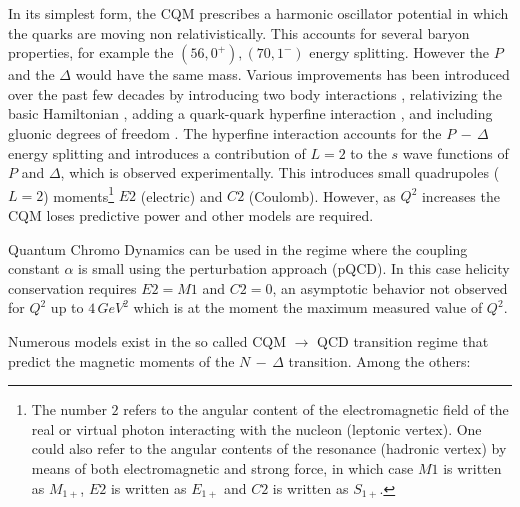 In its simplest form, the CQM prescribes a harmonic oscillator potential in which the quarks are moving
non relativistically. This accounts for several baryon properties, for example the $(56, 0^+),(70, 1^-)$
energy splitting. However the $P$ and the $\Delta$ would have the same mass.
Various improvements has been introduced over the past few decades by introducing two body interactions \cite{bib:twobody},
relativizing the basic Hamiltonian \cite{bib:relatiH}, adding a quark-quark hyperfine interaction \cite{bib:hyperfine},
 and including gluonic degrees of freedom \cite{bib:gluonic}.
The hyperfine interaction accounts for the $P\, -\,\Delta$ energy splitting and introduces a contribution of $L=2$ to the $s$ wave
functions of $P$ and $\Delta$, which is observed experimentally. This introduces small quadrupoles ($L=2$) 
moments\footnote{The number $2$ refers to the angular content of the electromagnetic field of the
real or virtual photon interacting with the nucleon (leptonic vertex). One could also refer to the angular 
contents of the resonance (hadronic vertex) by means of both electromagnetic and strong force, in 
which case $M1$ is written as $M_{1+}$, $E2$ is written as $E_{1+}$ and $C2$ is written as $S_{1+}$.}
$E2$ (electric) and $C2$ (Coulomb).
However, as $Q^2$ increases the CQM loses predictive power and other models are required. 

Quantum Chromo Dynamics can be used in the regime where the coupling constant $\alpha$ is small using the perturbation
approach (pQCD). In this case helicity conservation requires $E2 = M1$  and $C2 = 0$, an asymptotic behavior
not observed for $Q^2$ up to $4\, GeV^2$ which is at the moment the maximum measured value of $Q^2$.

Numerous models exist in the so called CQM $\rightarrow$ QCD transition regime that predict the magnetic moments
of the $N \,- \,\Delta$ transition. Among the others:

